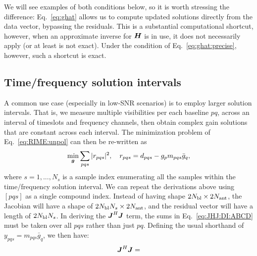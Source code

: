 \documentclass[useAMS,usenatbib]{mn2e}
\newcommand{\mat}[1]{{\bmath{#1}}}
\newcommand{\JJ}{\mat{J}} %
\newcommand{\HH}{\mat{H}} %
\newcommand{\JHJ}{\JJ^H\JJ} %
\numberwithin{equation}{section}
\providecommand{\DIFdelbegin}{} %
\begin{document}
We will see examples of both conditions below, so it is worth stressing the difference: Eq.~\ref{eq:ghat}
allows us to compute updated solutions directly from the data vector, bypassing the residuals. This is a 
substantial computational shortcut, however, when an approximate inverse for $\HH$ is in use, it 
does not necessarily apply (or at least is not exact). Under the condition of Eq.~\ref{eq:ghat:precise}, however, 
such a shortcut is exact.


\subsection{Time/frequency solution intervals}
\label{sec:unpol:DI:avg}
\label{sec:solution-intervals}

\newcommand{\Ns}{N_s}

A common use case (especially in low-SNR scenarios) is to employ larger solution intervals. 
That is, we measure multiple visibilities per each baseline $pq$, across an interval of timeslots and
frequency channels, then obtain complex gain solutions that are constant across each interval. The 
minimization problem of Eq.~\ref{eq:RIME:unpol} can then be re-written as
\begin{equation}
\label{eq:cal:DI:tf}
\min_{\bmath{g}}\sum_{pqs}|r_{pqs}|^2, 
~~~r_{pqs} = d_{pqs}-g_p m_{pqs} \bar{g}_q, 
\end{equation}
where $s=1,...,N_s$ is a sample index enumerating all the samples within the 
time/frequency solution interval. We can repeat the derivations above using  $[pqs]$ as a
single compound index. Instead of having shape $2N_\mathrm{bl}\times2N_\mathrm{ant}$, the Jacobian 
will have a shape of $2\Nbl\Ns\times 2\Na$, and the residual vector will have a length of 
$2\Nbl\Ns$. In deriving the $\JHJ$ term, the sums in Eq.~\ref{eq:JHJ:DI:ABCD} must be taken over all $pqs$ 
rather than just $pq$. Defining the usual shorthand of 
$y_{pqs}=m_{pqs}\bar{g}_q$, we then have:
\begin{equation}
\label{eq:JHJ:DI:tf}
\JJ^H \JJ = 
\DIFdelbegin %
\end{equation}%
\end{document}
